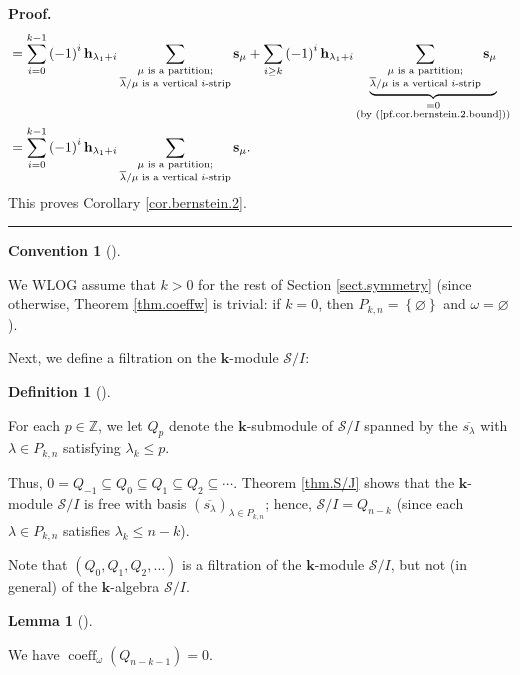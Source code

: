 \documentclass[numbers=enddot,12pt,final,onecolumn,notitlepage]{scrartcl}%
\theoremstyle{definition}
\newtheorem{lem}[theo]{Lemma}
\newenvironment{lemma}[1][]
{\begin{lem}[#1]\begin{leftbar}}
{\end{leftbar}\end{lem}}
\newtheorem{defi}[theo]{Definition}
\newenvironment{definition}[1][]
{\begin{defi}[#1]\begin{leftbar}}
{\end{leftbar}\end{defi}}
\newtheorem{conv}[theo]{Convention}
\newenvironment{convention}[1][]
{\begin{conv}[#1]\begin{leftbar}}
{\end{leftbar}\end{conv}}
\newenvironment{proof}[1][Proof]{\noindent\textbf{#1.} }{\ \rule{0.5em}{0.5em}}
\newenvironment{convention}[1][Convention]{\noindent\textbf{#1.} }{\ \rule{0.5em}{0.5em}}
\newenvironment{convention}[1][Convention]{\noindent\textbf{#1.} }{\ \rule{0.5em}{0.5em}}
\let\sumnonlimits\sum
\renewcommand{\sum}{\sumnonlimits\limits}
\begin{document}
\begin{proof}
\begin{align*}
&  =\sum_{i=0}^{k-1}\left(  -1\right)  ^{i}\mathbf{h}_{\lambda_{1}+i}%
\sum_{\substack{\mu\text{ is a partition;}\\\overline{\lambda}/\mu\text{ is a
vertical }i\text{-strip}}}\mathbf{s}_{\mu}+\sum_{i\geq k}\left(  -1\right)
^{i}\mathbf{h}_{\lambda_{1}+i}\underbrace{\sum_{\substack{\mu\text{ is a
partition;}\\\overline{\lambda}/\mu\text{ is a vertical }i\text{-strip}%
}}\mathbf{s}_{\mu}}_{\substack{=0\\\text{(by (\ref{pf.cor.bernstein.2.bound}%
))}}}\\
&  =\sum_{i=0}^{k-1}\left(  -1\right)  ^{i}\mathbf{h}_{\lambda_{1}+i}%
\sum_{\substack{\mu\text{ is a partition;}\\\overline{\lambda}/\mu\text{ is a
vertical }i\text{-strip}}}\mathbf{s}_{\mu}.
\end{align*}
This proves Corollary \ref{cor.bernstein.2}.
\end{proof}

\begin{convention}
We WLOG assume that $k>0$ for the rest of Section \ref{sect.symmetry} (since
otherwise, Theorem \ref{thm.coeffw} is trivial: if $k=0$, then $P_{k,n}%
=\left\{  \varnothing\right\}  $ and $\omega=\varnothing$).
\end{convention}

Next, we define a filtration on the $\mathbf{k}$-module $\mathcal{S}/I$:

\begin{definition}
\label{def.Qp}For each $p\in\mathbb{Z}$, we let $Q_{p}$ denote the
$\mathbf{k}$-submodule of $\mathcal{S}/I$ spanned by the $\overline
{s_{\lambda}}$ with $\lambda\in P_{k,n}$ satisfying $\lambda_{k}\leq p$.
\end{definition}

Thus, $0=Q_{-1}\subseteq Q_{0}\subseteq Q_{1}\subseteq Q_{2}\subseteq\cdots$.
Theorem \ref{thm.S/J} shows that the $\mathbf{k}$-module $\mathcal{S}/I$ is
free with basis $\left(  \overline{s_{\lambda}}\right)  _{\lambda\in P_{k,n}}%
$; hence, $\mathcal{S}/I=Q_{n-k}$ (since each $\lambda\in P_{k,n}$ satisfies
$\lambda_{k}\leq n-k$).

Note that $\left(  Q_{0},Q_{1},Q_{2},\ldots\right)  $ is a filtration of the
$\mathbf{k}$-module $\mathcal{S}/I$, but not (in general) of the $\mathbf{k}%
$-algebra $\mathcal{S}/I$.

\begin{lemma}
\label{lem.coeffw.coeffQ}We have $\operatorname*{coeff}\nolimits_{\omega
}\left(  Q_{n-k-1}\right)  =0$.
\end{lemma}
\end{document}
